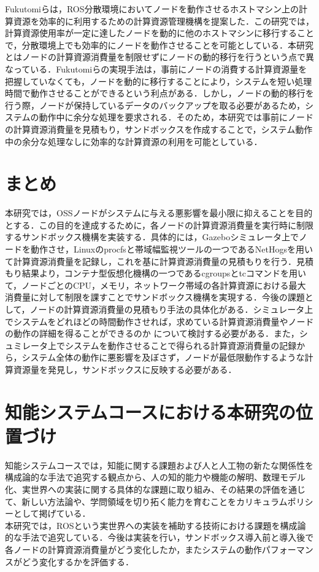 \documentclass[11pt]{ujarticle} %
\begin{document}
Fukutomiらは，ROS分散環境においてノードを動作させるホストマシン上の計算資源を効率的に利用するための計算資源管理機構を提案した\cite{ResourceManeger}．この研究では，計算資源使用率が一定に達したノードを動的に他のホストマシンに移行することで，分散環境上でも効率的にノードを動作させることを可能としている．本研究とはノードの計算資源消費量を制限せずにノードの動的移行を行うという点で異なっている．Fukutomiらの実現手法は，事前にノードの消費する計算資源量を把握していなくても，ノードを動的に移行することにより，システムを短い処理時間で動作させることができるという利点がある．しかし，ノードの動的移行を行う際，ノードが保持しているデータのバックアップを取る必要があるため，システムの動作中に余分な処理を要求される．そのため，本研究では事前にノードの計算資源消費量を見積もり，サンドボックスを作成することで，システム動作中の余分な処理なしに効率的な計算資源の利用を可能としている．

\section{まとめ}
本研究では，OSSノードがシステムに与える悪影響を最小限に抑えることを目的とする．この目的を達成するために，各ノードの計算資源消費量を実行時に制限するサンドボックス機構を実装する．具体的には，Gazeboシミュレータ上でノードを動作させ，Linuxのprocfsと帯域幅監視ツールの一つであるNetHogsを用いて計算資源消費量を記録し，これを基に計算資源消費量の見積もりを行う．見積もり結果より，コンテナ型仮想化機構の一つであるcgroupsとtcコマンドを用いて，ノードごとのCPU，メモリ，ネットワーク帯域の各計算資源における最大消費量に対して制限を課すことでサンドボックス機構を実現する．今後の課題として，ノードの計算資源消費量の見積もり手法の具体化がある．シミュレータ上でシステムをどれほどの時間動作させれば，求めている計算資源消費量やノードの動作の詳細を得ることができるのか
について検討する必要がある．また，シュミレータ上でシステムを動作させることで得られる計算資源消費量の記録から，システム全体の動作に悪影響を及ぼさず，ノードが最低限動作するような計算資源量を発見し，サンドボックスに反映する必要がある．

\section{知能システムコースにおける本研究の位置づけ}
知能システムコースでは，知能に関する課題および人と人工物の新たな関係性を構成論的な手法で追究する観点から、人の知的能力や機能の解明、数理モデル化、実世界への実装に関する具体的な課題に取り組み、その結果の評価を通じて、新しい方法論や、学問領域を切り拓く能力を育むことをカリキュラムポリシーとして掲げている．\\本研究では，ROSという実世界への実装を補助する技術における課題を構成論的な手法で追究している．今後は実装を行い，サンドボックス導入前と導入後で各ノードの計算資源消費量がどう変化したか，またシステムの動作パフォーマンスがどう変化するかを評価する．
\end{document}
